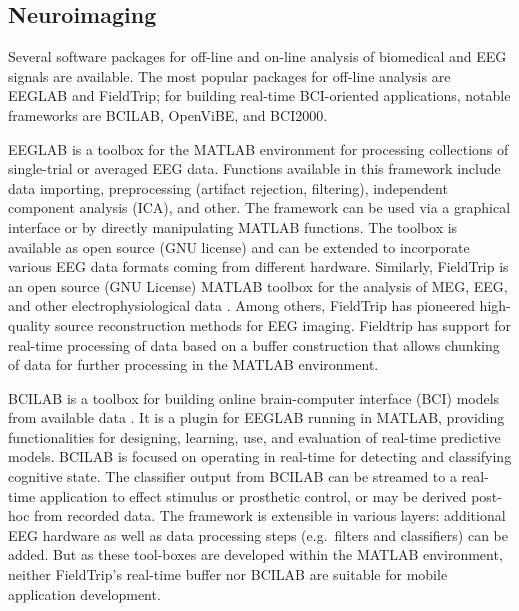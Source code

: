 \documentclass[10pt]{article}
\begin{document}
\subsection{Neuroimaging}

Several software packages for off-line and on-line analysis of biomedical and EEG signals are available. The most popular packages for off-line analysis are EEGLAB and FieldTrip; for building real-time BCI-oriented applications, notable frameworks are BCILAB, OpenViBE, and BCI2000.

EEGLAB is a toolbox for the MATLAB environment for processing collections of single-trial or averaged EEG data\cite{delorme2004eeglab}. Functions available in this framework include data importing, preprocessing (artifact rejection, filtering), independent component analysis (ICA), and other.
The framework can be used via a graphical interface or by directly manipulating MATLAB functions. The toolbox is available as open source (GNU license) and can be extended to incorporate various EEG data formats coming from different hardware.
Similarly, FieldTrip is an open source (GNU License) MATLAB toolbox for the analysis of MEG, EEG, and other electrophysiological data \cite{oostenveld2011fieldtrip}. Among others, FieldTrip has pioneered high-quality source reconstruction methods for EEG imaging. Fieldtrip has support for real-time processing of data based on a buffer construction that allows chunking of data for further processing in the MATLAB environment. 

BCILAB is a toolbox for building online brain-computer interface (BCI) models from available data \cite{delorme2011eeglab}. It is a plugin for EEGLAB running in MATLAB, providing functionalities for designing, learning, use, and evaluation of real-time predictive models. BCILAB is focused on operating in real-time  for detecting and classifying cognitive state. The classifier output from BCILAB can be streamed to a real-time application to effect stimulus or prosthetic control, or may be derived post-hoc from recorded data. The framework is extensible in various layers: additional EEG hardware as well as data processing steps (e.g.~filters and classifiers) can be added. But as these tool-boxes are developed within the MATLAB environment, neither FieldTrip's real-time buffer nor BCILAB are suitable for mobile application development.
\end{document}
